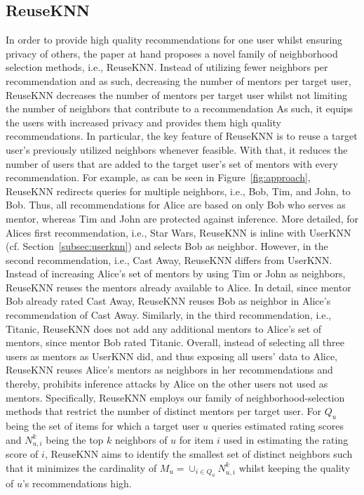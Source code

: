 \documentclass[manuscript,review,anonymous]{acmart}
\begin{document}
\subsection{ReuseKNN}
\label{subsec:reuseknn}
In order to provide high quality recommendations for one user whilst ensuring privacy of others, the paper at hand proposes a novel family of neighborhood selection methods, i.e., ReuseKNN.
Instead of utilizing fewer neighbors per recommendation and as such, decreasing the number of mentors per target user, ReuseKNN decreases the number of mentors per target user whilst not limiting the number of neighbors that contribute to a recommendation
As such, it equips the users with increased privacy and provides them high quality recommendations.
In particular, the key feature of ReuseKNN is to reuse a target user's previously utilized neighbors whenever feasible.
With that, it reduces the number of users that are added to the target user's set of mentors with every recommendation.
For example, as can be seen in Figure~\ref{fig:approach}, ReuseKNN redirects queries for multiple neighbors, i.e., Bob, Tim, and John, to Bob.
Thus, all recommendations for Alice are based on only Bob who serves as mentor, whereas Tim and John are protected against inference.
More detailed, for Alices first recommendation, i.e., Star Wars, ReuseKNN is inline with UserKNN (cf. Section~\ref{subsec:userknn}) and selects Bob as neighbor.
However, in the second recommendation, i.e., Cast Away, ReuseKNN differs from UserKNN.
Instead of increasing Alice's set of mentors by using Tim or John as neighbors, ReuseKNN reuses the mentors already available to Alice.
In detail, since mentor Bob already rated Cast Away, ReuseKNN reuses Bob as neighbor in Alice's recommendation of Cast Away.
Similarly, in the third recommendation, i.e., Titanic, ReuseKNN does not add any additional mentors to Alice's set of mentors, since mentor Bob rated Titanic.
Overall, instead of selecting all three users as mentors as UserKNN did, and thus exposing all users' data to Alice, ReuseKNN reuses Alice's mentors as neighbors in her recommendations and thereby, prohibits inference attacks by Alice on the other users not used as mentors.
Specifically, ReuseKNN employs our family of neighborhood-selection methods that restrict the number of distinct mentors per target user.
For $Q_u$ being the set of items for which a target user $u$ queries estimated rating scores and $N^k_{u, i}$ being the top $k$ neighbors of $u$ for item $i$ used in estimating the rating score of $i$, ReuseKNN aims to identify the smallest set of distinct neighbors such that it minimizes the cardinality of $M_u = \cup_{i \in Q_u} N^k_{u, i}$
whilst keeping the quality of $u$'s recommendations high.
\end{document}
